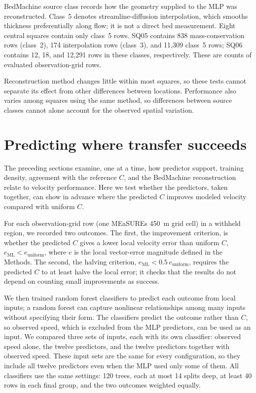 \documentclass[review,jog]{igs}
\begin{document}
BedMachine source class records how the geometry supplied to the MLP
was reconstructed. Class~5 denotes streamline-diffusion interpolation,
which smooths thickness preferentially along flow; it is not a direct
bed measurement. Eight central squares contain only class~5 rows.
SQ05 contains 838 mass-conservation rows (class~2), 174 interpolation
rows (class~3), and 11,309 class~5 rows; SQ06 contains 12, 18,
and 12,291 rows in these classes, respectively. These are counts of
evaluated observation-grid rows.

Reconstruction method changes little within most squares, so these tests cannot separate its effect from other differences between locations. Performance also varies among squares using the same method, so differences between source classes cannot alone account for the observed spatial variation.

\section{Predicting where transfer succeeds}
\label{app:transfer_predictability}

The preceding sections examine, one at a time, how predictor support, training density, agreement with the reference $C$, and the BedMachine reconstruction relate to velocity performance. Here we test whether the predictors, taken together, can show in
advance where the predicted $C$ improves modeled velocity compared with
uniform $C$.

For each observation-grid row (one MEaSUREs 450~m grid cell) in a withheld
region, we recorded two outcomes. The first, the improvement criterion, is
whether the predicted $C$ gives a lower local velocity error than uniform $C$,
$e_{\mathrm{ML}}<e_{\mathrm{uniform}}$, where $e$ is the local vector-error
magnitude defined in the Methods. The second, the halving criterion,
$e_{\mathrm{ML}}<0.5\,e_{\mathrm{uniform}}$, requires the predicted $C$ to at
least halve the local error; it checks that the results do not depend on
counting small improvements as success.

We then trained random forest classifiers \citep{breiman2001random} to predict
each outcome from local inputs; a random forest can capture nonlinear
relationships among many inputs without specifying their form. The classifiers
predict the outcome rather than $C$, so observed speed, which is excluded from
the MLP predictors, can be used as an input. We compared three sets of inputs,
each with its own classifier: observed speed alone, the twelve predictors, and
the twelve predictors together with observed speed. These input sets are the
same for every configuration, so they include all twelve predictors even when
the MLP used only some of them. All classifiers use the
same settings: 120 trees, each at most 14 splits deep, at least 40 rows in each
final group, and the two outcomes weighted equally.
\end{document}
